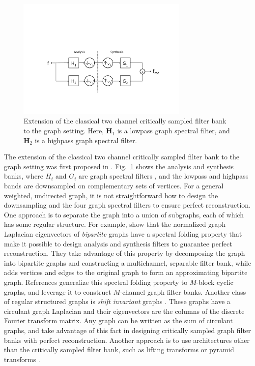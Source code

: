 \documentclass{article}
\begin{document}
\begin{figure}[t]
\centerline{\includegraphics[width=3.3in]{fig_two_channel_classical}}
\caption{Extension of the classical two channel critically sampled filter bank to the graph setting. Here, $\mathbf{H}_1$ is a lowpass graph spectral filter, and $\mathbf{H}_2$ is a highpass graph spectral filter.}\label{Fig:two_channel}
\end{figure}


The extension of the classical two channel critically sampled filter bank to the graph setting was first proposed in \cite{narang_icip}. Fig.\ \ref{Fig:two_channel} shows the analysis and synthesis banks, where $H_i$ and $G_i$ are graph spectral filters \cite{shuman2013emerging}, and the lowpass and highpass bands are downsampled on complementary sets of vertices. For a general weighted, undirected graph, it is not straightforward %
how to design the downsampling and the four graph spectral filters to ensure perfect reconstruction. One approach is to separate the graph into a union of subgraphs, each of which has some regular structure. For example, \cite{narang2012perfect,narang_bior_filters} show that the normalized graph Laplacian eigenvectors of \emph{bipartite} graphs have a spectral folding property that make it possible to design analysis and synthesis filters to guarantee perfect reconstruction. They take advantage of this property by decomposing the graph into bipartite graphs and constructing a multichannel, separable filter bank, while \cite{sakiyama} adds vertices and edges to the original graph to form an approximating bipartite graph. References \cite{teke2016,teke2017ii} generalize this spectral folding property to $M$-block cyclic graphs, and leverage it to construct $M$-channel graph filter banks. Another class of regular structured graphs is \emph{shift invariant} graphs \cite[Chapter 5.1]{grady}. These graphs have a circulant graph Laplacian and their eigenvectors are the columns of the discrete Fourier transform matrix. Any graph can be written as the sum of circulant graphs, and \cite{ekambaram_icip,ekambaram2013globalsip,kotzagiannidis2016icassp} take advantage of this fact in designing critically sampled graph filter banks with perfect reconstruction. Another approach is to use architectures other than the critically sampled filter bank, such as lifting transforms \cite{jansen,narang_lifting_graphs} or pyramid transforms \cite{shuman_TSP_multiscale}.
\end{document}

